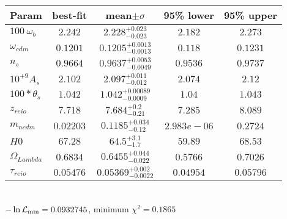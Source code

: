 \begin{tabular}{|l|c|c|c|c|} 
 \hline 
Param & best-fit & mean$\pm\sigma$ & 95\% lower & 95\% upper \\ \hline 
$100~\omega{}_{b }$ &$2.242$ & $2.228_{-0.023}^{+0.023}$ & $2.182$ & $2.273$ \\ 
$\omega{}_{cdm }$ &$0.1201$ & $0.1205_{-0.0013}^{+0.0013}$ & $0.118$ & $0.1231$ \\ 
$n_{s }$ &$0.9664$ & $0.9637_{-0.0049}^{+0.0053}$ & $0.9536$ & $0.9737$ \\ 
$10^{+9}A_{s }$ &$2.102$ & $2.097_{-0.012}^{+0.011}$ & $2.074$ & $2.12$ \\ 
$100*\theta{}_{s }$ &$1.042$ & $1.042_{-0.0009}^{+0.00089}$ & $1.04$ & $1.043$ \\ 
$z_{reio }$ &$7.718$ & $7.684_{-0.21}^{+0.2}$ & $7.285$ & $8.089$ \\ 
$m_{ncdm }$ &$0.02203$ & $0.1185_{-0.12}^{+0.034}$ & $2.983e-06$ & $0.2724$ \\ 
$H0$ &$67.28$ & $64.5_{-1.7}^{+3.1}$ & $59.89$ & $68.53$ \\ 
$\Omega{}_{Lambda }$ &$0.6834$ & $0.6455_{-0.022}^{+0.044}$ & $0.5766$ & $0.7026$ \\ 
$\tau{}_{reio }$ &$0.05476$ & $0.05369_{-0.0022}^{+0.002}$ & $0.04954$ & $0.05796$ \\ 
\hline 
 \end{tabular} \\ 
$-\ln{\cal L}_\mathrm{min} =0.0932745$, minimum $\chi^2=0.1865$ \\ 
